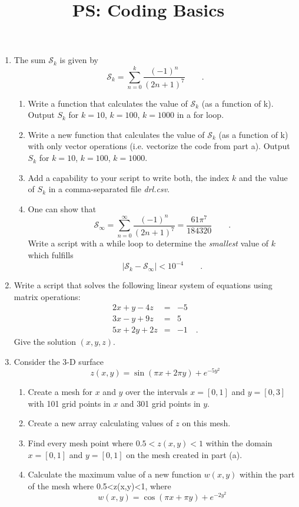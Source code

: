 \documentclass{article}
\title{\vspace{-1in} PS: Coding Basics}
\date{}
\newcommand{\beq}{\begin{equation*}}
\newcommand{\eeq}{\end{equation*}}
\newcommand{\be}{\begin{enumerate}}
\newcommand{\ee}{\end{enumerate}}
\begin{document}
\maketitle

\be
 \item The sum $\mathcal{S}_k$ is given by
\beq
\mathcal{S}_k= 
\sum_{n=0}^k \frac{(-1)^n}{(2n+1)^7}\qquad .
\eeq

\be
\item Write a function that calculates the value of $\mathcal{S}_k$ (as a function of k). Output $S_k$ for $k=10$, $k=100$, $k=1000$ in a for loop. 
\item Write a new function that calculates the value of $\mathcal{S}_k$ (as a function of k) with only vector operations (i.e. vectorize the code from part a). Output $S_k$ for $k=10$, $k=100$, $k=1000$. 
\item Add a capability to your script to write both, the index $k$ and the value of $S_k$ in a comma-separated file \emph{drl.csv}.
\item One can show that
\beq
\mathcal{S}_\infty= 
\sum_{n=0}^\infty\frac{(-1)^n}{(2n+1)^7}=\frac{61\pi^7}{184320}\qquad .
\eeq
Write a script with a while loop to determine the \emph{smallest} value of $k$ which fulfills 
\beq
\left|\mathcal{S}_k-\mathcal{S}_\infty \right|< 10^{-4}\qquad.
\eeq
\ee
\item Write a script that solves the following linear system of equations using matrix operations:
\begin{eqnarray*}
2x+y-4z & = & -5 \\
3x-y+9z &=& 5\\
5x+2y + 2z &=& -1\quad .
\end{eqnarray*}
Give the solution $(x,y,z)$.

\item Consider the 3-D surface
\beq
z(x,y) = \sin \left(\pi x + 2 \pi y \right) + e^{-5 y^2}
\eeq

\be
\item Create a mesh for $x$ and $y$ over the intervals $x = [0,1]$ and  $y = [0,3]$ with 101 grid points in $x$ and 301 grid points in $y$.
\item Create a new array calculating values of $z$ on this mesh.
\item Find every mesh point where $0.5<z(x,y)<1$ within the domain $x = [0,1]$ and $y = [0,1]$ on the mesh created in part (a).
\item Calculate the maximum value of a new function $w(x,y)$ within the part of the mesh where 0.5<z(x,y)<1, where
\beq
w(x,y) = \cos \left(\pi x + \pi y \right) + e^{-2 y^2}
\eeq

\ee

\ee 
\end{document}
